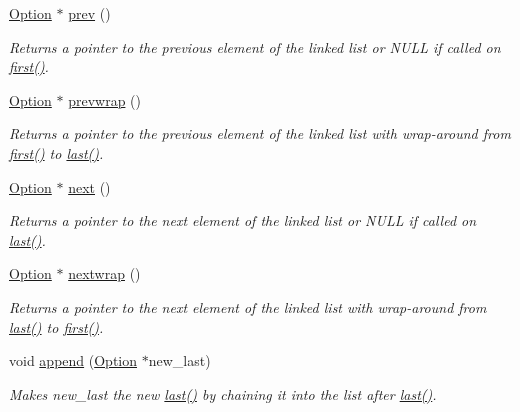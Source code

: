 \begin{DoxyCompactItemize}
\hyperlink{classoption_1_1_option}{\-Option} $\ast$ \hyperlink{classoption_1_1_option_a4d12001a91b0b35cf47437d0c60d2b52}{prev} ()
\begin{DoxyCompactList}\small\item\em \-Returns a pointer to the previous element of the linked list or \-N\-U\-L\-L if called on \hyperlink{classoption_1_1_option_abb4e13cd7c90999c8a6b1f871cece283}{first()}. \end{DoxyCompactList}\item 
\hyperlink{classoption_1_1_option}{\-Option} $\ast$ \hyperlink{classoption_1_1_option_a1226e45dc2de30f269b2aff1784bbee7}{prevwrap} ()
\begin{DoxyCompactList}\small\item\em \-Returns a pointer to the previous element of the linked list with wrap-\/around from \hyperlink{classoption_1_1_option_abb4e13cd7c90999c8a6b1f871cece283}{first()} to \hyperlink{classoption_1_1_option_afe2aff68191e55b59c53fac3dbbcd7c3}{last()}. \end{DoxyCompactList}\item 
\hyperlink{classoption_1_1_option}{\-Option} $\ast$ \hyperlink{classoption_1_1_option_a59ae9aed505f4d410633bb36478a32be}{next} ()
\begin{DoxyCompactList}\small\item\em \-Returns a pointer to the next element of the linked list or \-N\-U\-L\-L if called on \hyperlink{classoption_1_1_option_afe2aff68191e55b59c53fac3dbbcd7c3}{last()}. \end{DoxyCompactList}\item 
\hyperlink{classoption_1_1_option}{\-Option} $\ast$ \hyperlink{classoption_1_1_option_ae8d8c058af3c781cb1d444998df48fef}{nextwrap} ()
\begin{DoxyCompactList}\small\item\em \-Returns a pointer to the next element of the linked list with wrap-\/around from \hyperlink{classoption_1_1_option_afe2aff68191e55b59c53fac3dbbcd7c3}{last()} to \hyperlink{classoption_1_1_option_abb4e13cd7c90999c8a6b1f871cece283}{first()}. \end{DoxyCompactList}\item 
void \hyperlink{classoption_1_1_option_a59030822a1ec4e667e6c288d7e5ec961}{append} (\hyperlink{classoption_1_1_option}{\-Option} $\ast$new\-\_\-last)
\begin{DoxyCompactList}\small\item\em \-Makes {\ttfamily new\-\_\-last} the new \hyperlink{classoption_1_1_option_afe2aff68191e55b59c53fac3dbbcd7c3}{last()} by chaining it into the list after \hyperlink{classoption_1_1_option_afe2aff68191e55b59c53fac3dbbcd7c3}{last()}. \end{DoxyCompactList}\item 

\end{DoxyCompactItemize}
